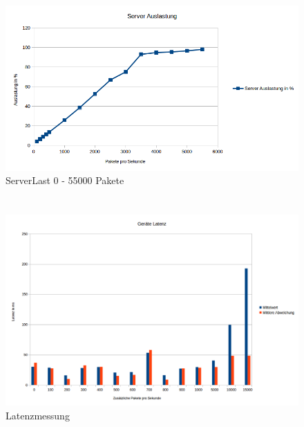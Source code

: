 \documentclass[a4paper]{spie}  %
\begin{document}
\begin{appendices}
\section{}
\begin{figure}[H]
	\centering
	\includegraphics[width=1\textwidth]{images/ServerLast3.png}
	\caption{ServerLast 0 - 55000 Pakete}
	\label{serverlast2}
\end{figure}

\section{}
\begin{figure}[H]
	\centering
	\includegraphics[width=1\textwidth]{images/LatenzMessung.png}
	\caption{Latenzmessung}
	\label{latenzmessung}
\end{figure}
\end{appendices}
\end{document}
